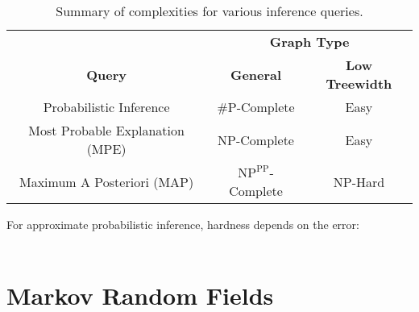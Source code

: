 				\begin{table}
					\centering
					\begin{tabular}{c|c|c}
						\toprule
						                                &          \multicolumn{2}{c}{\textbf{Graph Type}}          \\
						        \textbf{Query}          &         \textbf{General}         & \textbf{Low Treewidth} \\ \midrule
						    Probabilistic Inference     &           \#P-Complete           &          Easy          \\
						Most Probable Explanation (MPE) &           NP-Complete            &          Easy          \\
						  Maximum A Posteriori (MAP)    & \(\text{NP}^\text{PP}\)-Complete &        NP-Hard         \\ \bottomrule
					\end{tabular}
					\begin{center}
						For approximate probabilistic inference, hardness depends on the error: \\
						 \\
					\end{center}
					\vspace{-0.4cm}
					\caption[Summary of Inference Complexities]{Summary of complexities for various inference queries.}
					\label{fig:inferenceComplexity}
				\end{table}

\chapter{Markov Random Fields}
	\label{c:mrf}

